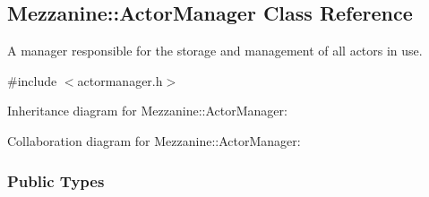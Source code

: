 \hypertarget{classMezzanine_1_1ActorManager}{\subsection{Mezzanine\-:\-:Actor\-Manager Class Reference}
\label{classMezzanine_1_1ActorManager}
}


A manager responsible for the storage and management of all actors in use.  




{\ttfamily \#include $<$actormanager.\-h$>$}



Inheritance diagram for Mezzanine\-:\-:Actor\-Manager\-:


Collaboration diagram for Mezzanine\-:\-:Actor\-Manager\-:
\subsubsection*{Public Types}
